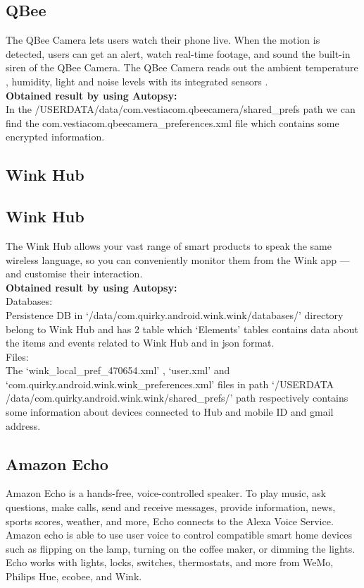 \documentclass{easychair}
\begin{document}
\begin{enumerate}
\subsection{QBee}
The QBee Camera lets users watch their phone live. When the motion is detected, users can get an alert, watch real-time footage, and sound the built-in siren of the QBee Camera. The QBee Camera reads out the ambient temperature , humidity, light and noise levels with its integrated sensors \cite{pari_6}.\\

\textbf{Obtained result by using Autopsy:}\\

In the /USERDATA/data/com.vestiacom.qbeecamera/shared\_prefs path we can find the com.vestiacom.qbeecamera\_preferences.xml file which contains some encrypted information.\\

\subsection{Wink Hub}
\subsection{Wink Hub}
The Wink Hub allows your vast range of smart products to speak the same wireless language, so you can conveniently monitor them from the Wink app — and customise their interaction\cite{pari_7}.\\
\textbf{Obtained result by using Autopsy:}\\

Databases:\\
Persistence DB in ‘/data/com.quirky.android.wink.wink/databases/’ directory belong to Wink Hub and has 2 table which ‘Elements’ tables contains data about the items and events related to Wink Hub and in json format.\\

Files:\\
The ‘wink\_local\_pref\_470654.xml’ , ‘user.xml’ and ‘com.quirky.android.wink.wink\_preferences.xml’ files in path ‘/USERDATA /data/com.quirky.android.wink.wink/shared\_prefs/’ path respectively contains some information about devices connected to Hub and mobile ID and gmail address.\\

\subsection{Amazon Echo}
Amazon Echo is a hands-free, voice-controlled speaker. To play music, ask questions, make calls, send and receive messages, provide information, news, sports scores, weather, and more, Echo connects to the Alexa Voice Service. Amazon echo is able to use user voice to control compatible smart home devices  such as flipping on the lamp, turning on the coffee maker, or dimming the lights. Echo works with lights, locks, switches, thermostats, and more from WeMo, Philips Hue, ecobee, and Wink\cite{pari_8}.\\


\end{enumerate}
\end{document}
